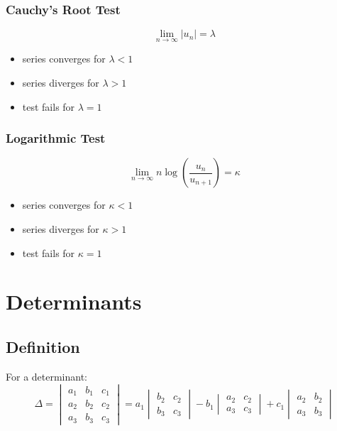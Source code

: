 \documentclass[openany, oneside]{book}
\begin{document}
\subsection{Cauchy's Root Test}
\begin{equation}
\lim_{n\to\infty} \lvert u_n \rvert=\lambda
\end{equation}
\begin{itemize}
\item series converges for $\lambda<1$
\item series diverges for $\lambda>1$
\item test fails for $\lambda=1$
\end{itemize}

\subsection{Logarithmic Test}
\begin{equation}
\lim_{n\to\infty} n\log(\dfrac{u_n}{u_{n+1}})=\kappa
\end{equation}
\begin{itemize}
\item series converges for $\kappa<1$
\item series diverges for $\kappa>1$
\item test fails for $\kappa=1$
\end{itemize}

\large{\chapter{Determinants}}
\section{Definition}
For a determinant:
\begin{equation}
\Delta=\begin{vmatrix}
a_1&b_1&c_1\\
a_2&b_2&c_2\\
a_3&b_3&c_3
\end{vmatrix}=a_1\begin{vmatrix}b_2&c_2\\b_3&c_3\end{vmatrix}-b_1\begin{vmatrix}a_2&c_2\\a_3&c_3\end{vmatrix}+c_1\begin{vmatrix}a_2&b_2\\a_3&b_3\end{vmatrix}
\end{equation}
\end{document}
